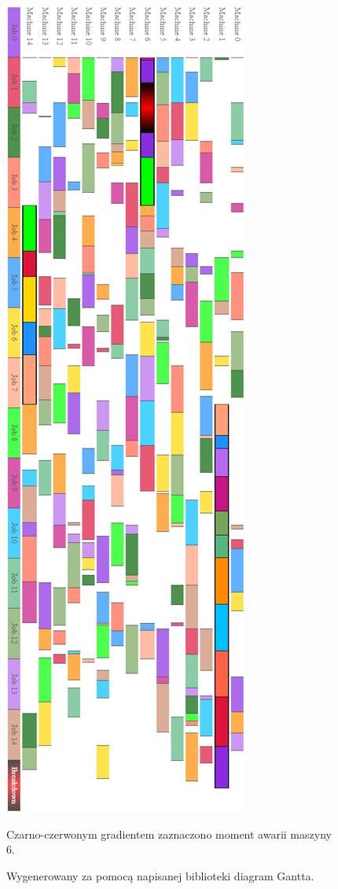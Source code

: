 \documentclass[printmode,oneside]{mgr}
\begin{document}
\begin{figure}[!ht]
\begin{center}
\includegraphics[scale=0.52]{rysunki/scheduleTail00.png}
\caption{Wygenerowany za pomocą napisanej biblioteki diagram Gantta.}{Czarno-czerwonym gradientem zaznaczono moment awarii maszyny 6.}
\label{rys_Gantt_HTML}
\end{center}
\end{figure}
%
\end{document}

